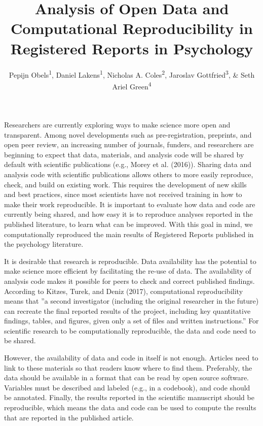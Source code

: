 \documentclass[
  ,jou, a4paper,floatsintext]{apa6}
\affiliation{
\vspace{0.5cm}
\textsuperscript{1} Eindhoven University of Technology, The Netherlands\\\textsuperscript{2} University of Tennessee, Knoxville, USA\\\textsuperscript{3} Masaryk University, Brno, Czech Republic\\\textsuperscript{4} Code Ocean, New York, USA}
\title{Analysis of Open Data and Computational Reproducibility in Registered Reports in Psychology}
\author{Pepijn Obels\textsuperscript{1}, Daniel Lakens\textsuperscript{1}, Nicholas A. Coles\textsuperscript{2}, Jaroslav Gottfried\textsuperscript{3}, \& Seth Ariel Green\textsuperscript{4}}
\date{}
\begin{document}
\maketitle

Researchers are currently exploring ways to make science more open and transparent. Among novel developments such as pre-registration, preprints, and open peer review, an increasing number of journals, funders, and researchers are beginning to expect that data, materials, and analysis code will be shared by default with scientific publications (e.g., Morey et al. (2016)). Sharing data and analysis code with scientific publications allows others to more easily reproduce, check, and build on existing work. This requires the development of new skills and best practices, since most scientists have not received training in how to make their work reproducible. It is important to evaluate how data and code are currently being shared, and how easy it is to reproduce analyses reported in the published literature, to learn what can be improved. With this goal in mind, we computationally reproduced the main results of Registered Reports published in the psychology literature.

It is desirable that research is reproducible. Data availability has the potential to make science more efficient by facilitating the re-use of data. The availability of analysis code makes it possible for peers to check and correct published findings. According to Kitzes, Turek, and Deniz (2017), computational reproducibility means that ''a second investigator (including the original researcher in the future) can recreate the final reported results of the project, including key quantitative findings, tables, and figures, given only a set of files and written instructions.'' For scientific research to be computationally reproducible, the data and code need to be shared.

However, the availability of data and code in itself is not enough. Articles need to link to these materials so that readers know where to find them. Preferably, the data should be available in a format that can be read by open source software. Variables must be described and labeled (e.g., in a codebook), and code should be annotated. Finally, the results reported in the scientific manuscript should be reproducible, which means the data and code can be used to compute the results that are reported in the published article.
\end{document}

